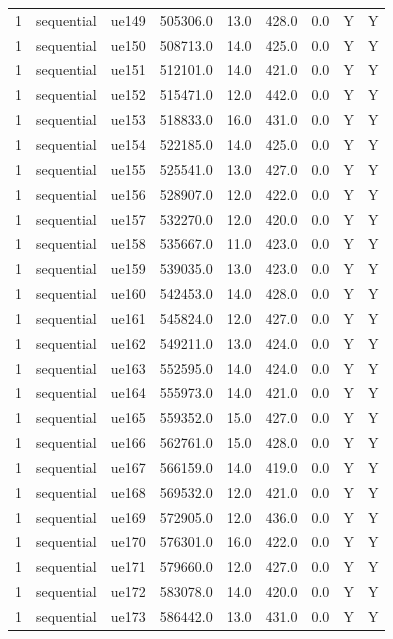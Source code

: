 \begin{table}[ht]
\begin{tabular}{|c|c|c|c|c|c|c|c|c|}
1 & sequential & ue149 & 505306.0 & 13.0 & 428.0 & 0.0 & Y & Y \\
1 & sequential & ue150 & 508713.0 & 14.0 & 425.0 & 0.0 & Y & Y \\
1 & sequential & ue151 & 512101.0 & 14.0 & 421.0 & 0.0 & Y & Y \\
1 & sequential & ue152 & 515471.0 & 12.0 & 442.0 & 0.0 & Y & Y \\
1 & sequential & ue153 & 518833.0 & 16.0 & 431.0 & 0.0 & Y & Y \\
1 & sequential & ue154 & 522185.0 & 14.0 & 425.0 & 0.0 & Y & Y \\
1 & sequential & ue155 & 525541.0 & 13.0 & 427.0 & 0.0 & Y & Y \\
1 & sequential & ue156 & 528907.0 & 12.0 & 422.0 & 0.0 & Y & Y \\
1 & sequential & ue157 & 532270.0 & 12.0 & 420.0 & 0.0 & Y & Y \\
1 & sequential & ue158 & 535667.0 & 11.0 & 423.0 & 0.0 & Y & Y \\
1 & sequential & ue159 & 539035.0 & 13.0 & 423.0 & 0.0 & Y & Y \\
1 & sequential & ue160 & 542453.0 & 14.0 & 428.0 & 0.0 & Y & Y \\
1 & sequential & ue161 & 545824.0 & 12.0 & 427.0 & 0.0 & Y & Y \\
1 & sequential & ue162 & 549211.0 & 13.0 & 424.0 & 0.0 & Y & Y \\
1 & sequential & ue163 & 552595.0 & 14.0 & 424.0 & 0.0 & Y & Y \\
1 & sequential & ue164 & 555973.0 & 14.0 & 421.0 & 0.0 & Y & Y \\
1 & sequential & ue165 & 559352.0 & 15.0 & 427.0 & 0.0 & Y & Y \\
1 & sequential & ue166 & 562761.0 & 15.0 & 428.0 & 0.0 & Y & Y \\
1 & sequential & ue167 & 566159.0 & 14.0 & 419.0 & 0.0 & Y & Y \\
1 & sequential & ue168 & 569532.0 & 12.0 & 421.0 & 0.0 & Y & Y \\
1 & sequential & ue169 & 572905.0 & 12.0 & 436.0 & 0.0 & Y & Y \\
1 & sequential & ue170 & 576301.0 & 16.0 & 422.0 & 0.0 & Y & Y \\
1 & sequential & ue171 & 579660.0 & 12.0 & 427.0 & 0.0 & Y & Y \\
1 & sequential & ue172 & 583078.0 & 14.0 & 420.0 & 0.0 & Y & Y \\
1 & sequential & ue173 & 586442.0 & 13.0 & 431.0 & 0.0 & Y & Y \\

\end{tabular}
\end{table}
